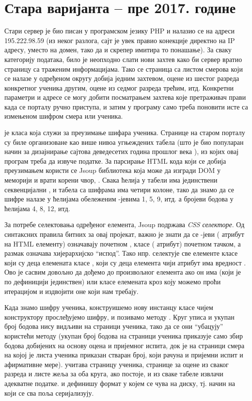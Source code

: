 \section{Стара варијанта -- пре 2017. године}

Стари сервер је био писан у програмском језику PHP и налазио се на адреси 195.222.98.59 (из неког разлога, сајт је увек правио конекције директно на IP адресу, уместо на домен, тако да и скрепер имитира то понашање). За сваку категорију података, било је неопходно слати нови захтев како би сервер вратио страницу са траженим информацијама. Тако се страница са листом смерова који се налазе у одређеном округу добија једним захтевом, оцене из шестог разреда конкретног ученика другим, оцене из седмог разреда трећим, итд. Конкретни параметри и адресе се могу добити посматрањем захтева које претраживач прави када се порталу ручно приступа, и затим у програму само треба поновити исте са измењеном шифром смера или ученика.

 је класа која служи за преузимање шифара ученика. Странице на старом порталу су биле организоване као више нивоа угњеждених табела (што је био популаран начин за дизајнирање сајтова деведесетих година прошлог века \citep{htmltables}), из којих овај програм треба да извуче податке. За парсирање HTML кода који се добија преузимањем користи се Jsoup библиотека која може да изгради DOM у меморији и врати корени чвор, . Свака ћелија у табели има јединствени секвенцијални , и табела са шифрама има четири колоне, тако да знамо да се шифре налазе у ћелијама обележеним -јевима 1, 5, 9, итд. а бројеви бодова у ћелијама 4, 8, 12, итд.

За потребе селектовања одређеног елемента, Jsoup подржава \emph{CSS селекторе}. Од синтаксних правила битних за овај пројекат, важно је знати да се -јеви ( атрибут на HTML елементу) означавају почетном \code{\#}, класе ( атрибут) почетном тачком, а размак означава хијерархијско \enquote{испод}. Тако нпр.  селектује све елементе класе  који су деца елемената класе , који су деца елемента чији  атрибут има вредност . Ово је сасвим довољно да дођемо до произвољног елемента ако он има  (који је по дефиницији јединствен) или класе елемената кроз коју можемо проћи итерацијом и издвојити оне који нам требају.

Када знамо шифру ученика, конструишемо нову инстанцу класе  чијем конструктору прослеђујемо шифру, и позивамо методу . Круг уписа и укупан број бодова нису видљиви на страници ученика, тако да се они \enquote{убацују} користећи  методу (укупан број бодова на страници ученика приказује само збир бодова добијених на основу оцена и пријемног испита, док је на страници смера на којој је листа ученика приказан стваран број, који рачуна и пријемни испит и афирмативне мере).  учитава страницу ученика, странице за оцене из сваког разреда и листе жеља за оба круга, ако постоје, и из сваке табеле извлачи адекватне податке.  и  дефинишу формат у којем се  чува на диску, тј. начин на који се сва поља серијализују.

